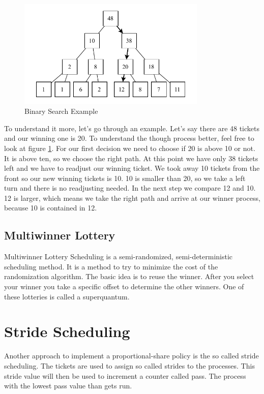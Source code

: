 \begin{figure}[h]
    \centering
    \includegraphics[width=0.8\textwidth]{Assets/Binary-Search.pdf}
    \caption{Binary Search Example}
    \label{fig:binary-search}
\end{figure}

To understand it more, let's go through an example. Let's say there are 48 tickets and our winning one is 20.
To understand the though process better, feel free to look at figure \ref{fig:binary-search}.
For our first decision we need to choose if 20 is above 10 or not.
It is above ten, so we choose the right path.
At this point we have only 38 tickets left and we have to readjust our winning ticket.
We took away 10 tickets from the front so our new winning tickets is 10.
10 is smaller than 20, so we take a left turn and there is no readjusting needed.
In the next step we compare 12 and 10.
12 is larger, which means we take the right path and arrive at our winner process, because 10 is contained in 12.

\subsection{Multiwinner Lottery}

Multiwinner Lottery Scheduling is a semi-randomized, semi-deterministic scheduling method.
It is a method to try to minimize the cost of the randomization algorithm.
The basic idea is to reuse the winner.
After you select your winner you take a specific offset to determine the other winners.
One of these lotteries is called a superquantum.

\section{Stride Scheduling}

Another approach to implement a proportional-share policy is the so called stride scheduling.
The tickets are used to assign so called strides to the processes.
This stride value will then be used to increment a counter called pass.
The process with the lowest pass value than gets run.

